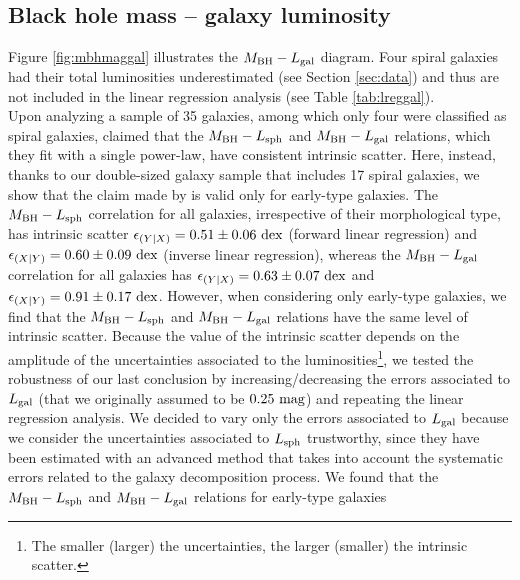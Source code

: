 \documentclass[preprint2]{emulateapj}
\begin{document}
\subsection{Black hole mass -- galaxy luminosity}
Figure \ref{fig:mbhmaggal} illustrates the $M_{\rm BH} - L_{\rm gal}$ diagram.
Four spiral galaxies had their total luminosities underestimated (see Section \ref{sec:data}) 
and thus are not included in the linear regression analysis (see Table \ref{tab:lreggal}). \\
Upon analyzing a sample of 35 galaxies, among which only four were classified as spiral galaxies, 
\cite{lasker2014anal} claimed that the $M_{\rm BH} - L_{\rm sph}$ and $M_{\rm BH} - L_{\rm gal}$ relations, 
which they fit with a single power-law, have consistent intrinsic scatter.
Here, instead, thanks to our double-sized galaxy sample that includes 17 spiral galaxies, 
we show that the claim made by \cite{lasker2014anal} is valid only for early-type galaxies. 
The $M_{\rm BH} - L_{\rm sph}$ correlation for all galaxies, irrespective of their morphological type, 
has intrinsic scatter $\epsilon_{(Y|X)} = 0.51 \pm 0.06\rm~dex$ (forward linear regression) 
and $\epsilon_{(X|Y)} = 0.60 \pm 0.09\rm~dex$ (inverse linear regression), 
whereas the $M_{\rm BH} - L_{\rm gal}$ correlation for all galaxies has $\epsilon_{(Y|X)} = 0.63 \pm 0.07\rm~dex$ 
and $\epsilon_{(X|Y)} = 0.91 \pm 0.17\rm~dex$.
However, when considering only early-type galaxies, 
we find that the $M_{\rm BH} - L_{\rm sph}$ and $M_{\rm BH} - L_{\rm gal}$ relations have the same level of intrinsic scatter. 
Because the value of the intrinsic scatter depends on the amplitude of the uncertainties associated to the luminosities\footnote{The 
smaller (larger) the uncertainties, the larger (smaller) the intrinsic scatter.}, 
we tested the robustness of our last conclusion by increasing/decreasing the errors associated to $L_{\rm gal}$ 
(that we originally assumed to be $0.25\rm~mag$) and repeating the linear regression analysis. 
We decided to vary only the errors associated to $L_{\rm gal}$ 
because we consider the uncertainties associated to $L_{\rm sph}$ trustworthy, since they have been estimated with an advanced method 
that takes into account the systematic errors related to the galaxy decomposition process. 
We found that the $M_{\rm BH} - L_{\rm sph}$ and $M_{\rm BH} - L_{\rm gal}$ relations for early-type galaxies 
\end{document}
